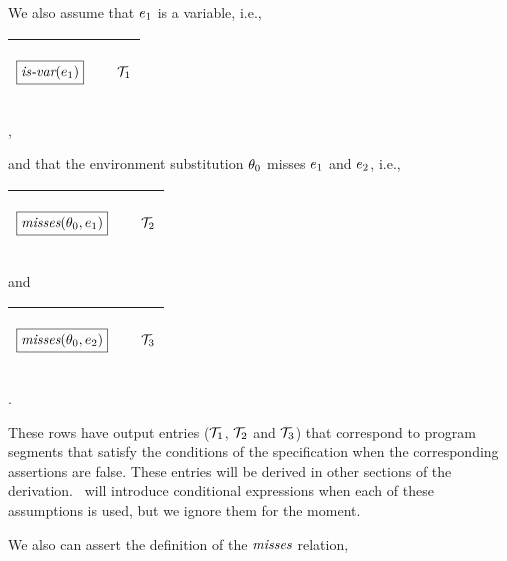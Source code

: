 \documentclass[runningheads]{llncs}
\DeclareMathOperator{\isvar}{\emph{is-var}}
\begin{document}
We also assume that $e_{1}$ is a variable, i.e.,
\begin{center}
  \begin{tabular}{|m{}|m{}||m{}|}
\hline
\begin{center}
$\boxed{\isvar(\e{1})}$
\end{center}& & \begin{center} ${\mathcal{T}}_{1}$ \end{center} \\  \hline
\end{tabular},
\end{center}
and that the environment substitution $\theta_{0}$ misses $e_{1}$ and $e_{2}$, i.e.,
\begin{center}
  \begin{tabular}{|m{}|m{}||m{}|}
\hline
\begin{center}
 $\boxed{\emph{misses}(\theta_{0},e_{1})}$
\end{center} 
& & \begin{center} ${\mathcal{T}}_{2}$ \end{center} \\  \hline
\end{tabular}
\end{center}
and 
\begin{center}
  \begin{tabular}{|m{}|m{}||m{}|}
\hline
\begin{center}
 $\boxed{\emph{misses}(\theta_{0},e_{2})}$
\end{center} 
& & \begin{center} ${\mathcal{T}}_{3}$ \end{center} \\  \hline
\end{tabular}.
\end{center}
These rows have output entries (${\mathcal{T}}_{1}$, ${\mathcal{T}}_{2}$ and ${\mathcal{T}}_{3}$) that correspond to program segments that satisfy the conditions of the specification when the corresponding assertions are false.  These entries will be derived in other sections of the derivation.  \SNARK\ will introduce conditional expressions when each of these assumptions is used, but we ignore them for the moment. 

We also can assert the definition of the $\emph{misses}$ relation, 
\end{document}

